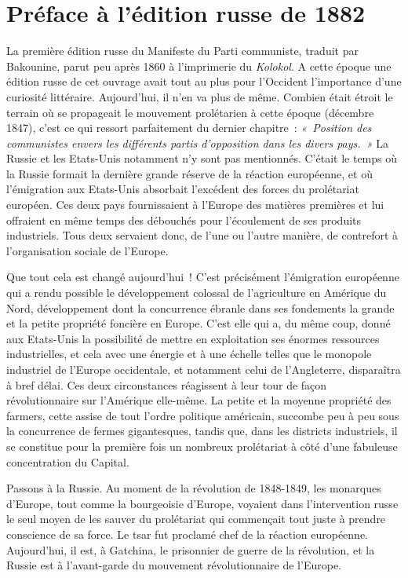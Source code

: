 \documentclass[french,twoside]{book} %
\begin{document}
\section[{Préface à l’édition russe de 1882}]{Préface à l’édition russe de 1882}
\noindent La première édition russe du Manifeste du Parti communiste, traduit par Bakounine, parut peu après 1860 à l’imprimerie du \emph{Kolokol}. A cette époque une édition russe de cet ouvrage avait tout au plus pour l’Occident l’importance d’une curiosité littéraire. Aujourd’hui, il n’en va plus de même. Combien était étroit le terrain où se propageait le mouvement prolétarien à cette époque (décembre 1847), c’est ce qui ressort parfaitement du dernier chapitre : \emph{« Position des communistes envers les différents partis d’opposition dans les divers pays. »} La Russie et les Etats-Unis notamment n’y sont pas mentionnés. C'était le temps où la Russie formait la dernière grande réserve de la réaction européenne, et où l’émigration aux Etats-Unis absorbait l’excédent des forces du prolétariat européen. Ces deux pays fournissaient à l’Europe des matières premières et lui offraient en même temps des débouchés pour l’écoulement de ses produits industriels. Tous deux servaient donc, de l’une ou l’autre manière, de contrefort à l’organisation sociale de l’Europe.\par
Que tout cela est changé aujourd’hui ! C'est précisément l’émigration européenne qui a rendu possible le développement colossal de l’agriculture en Amérique du Nord, développement dont la concurrence ébranle dans ses fondements la grande et la petite propriété foncière en Europe. C'est elle qui a, du même coup, donné aux Etats-Unis la possibilité de mettre en exploitation ses énormes ressources industrielles, et cela avec une énergie et à une échelle telles que le monopole industriel de l’Europe occidentale, et notamment celui de l’Angleterre, disparaîtra à bref délai. Ces deux circonstances réagissent à leur tour de façon révolutionnaire sur l’Amérique elle-même. La petite et la moyenne propriété des farmers, cette assise de tout l’ordre politique américain, succombe peu à peu sous la concurrence de fermes gigantesques, tandis que, dans les districts industriels, il se constitue pour la première fois un nombreux prolétariat à côté d’une fabuleuse concentration du Capital.\par
Passons à la Russie. Au moment de la révolution de 1848-1849, les monarques d’Europe, tout comme la bourgeoisie d’Europe, voyaient dans l’intervention russe le seul moyen de les sauver du prolétariat qui commençait tout juste à prendre conscience de sa force. Le tsar fut proclamé chef de la réaction européenne. Aujourd’hui, il est, à Gatchina, le prisonnier de guerre de la révolution, et la Russie est à l’avant-garde du mouvement révolutionnaire de l’Europe.\par
\end{document}
